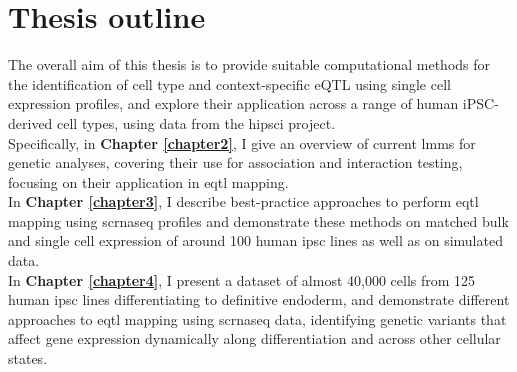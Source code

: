 \newpage

\section{Thesis outline}




The overall aim of this thesis is to provide suitable computational methods for the identification of cell type and context-specific eQTL using single cell expression profiles, 
and explore their application across a range of human iPSC-derived cell types, using data from the \gls{hipsci} project.\\



Specifically, in \textbf{Chapter 
\ref{chapter2}}, I give an overview of current \glspl{lmm} for genetic analyses, covering their use for association and interaction testing, focusing on their application in \gls{eqtl} mapping.\\

In \textbf{Chapter 
\ref{chapter3}}, I describe best-practice approaches to perform \gls{eqtl} mapping using \gls{scrnaseq} profiles and demonstrate these methods on matched bulk and single cell expression of around 100 human \gls{ipsc} lines as well as on simulated data.  \\

In \textbf{Chapter 
\ref{chapter4}}, I present a dataset of almost 40,000 cells from 125 human \gls{ipsc} lines differentiating to definitive endoderm, and demonstrate different approaches to \gls{eqtl} mapping using \gls{scrnaseq} data, identifying genetic variants that affect gene expression dynamically along differentiation and across other cellular states. \\

